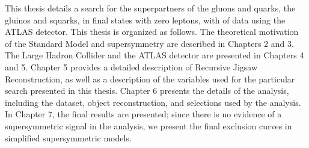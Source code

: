 This thesis details a search for the superpartners of the gluons and quarks, the gluinos and squarks, in final states with zero leptons, with \todo{ 7 \ifb} of data using the ATLAS detector.
This thesis is organized as follows.
The theoretical motivation of the Standard Model and supersymmetry are described in Chapters 2 and 3.
The Large Hadron Collider and the ATLAS detector are presented in Chapters 4 and 5.
Chapter 5 provides a detailed description of Recursive Jigsaw Reconstruction, as well as a description of the variables used for the particular search presented in this thesis.
Chapter 6 presents the details of the analysis, including the dataset, object reconstruction, and selections used by the analysis.
In Chapter 7, the final results are presented; since there is no evidence of a supersymmetric signal in the analysis, we present the final exclusion curves in simplified supersymmetric models.
